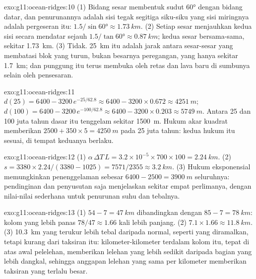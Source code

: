 \begin{solution}{exo:g11:ocean-ridges:10}
(1) Bidang sesar membentuk sudut \ang{60} dengan bidang datar, dan penurunannya
adalah sisi tegak segitiga siku-siku yang sisi miringnya adalah pergeseran itu:
$1.5/\sin\ang{60} \approx \qty{1.73}{km}$. (2) Setiap sesar menjauhkan kedua sisi
secara mendatar sejauh $1.5/\tan\ang{60} \approx \qty{0.87}{km}$; kedua sesar
bersama-sama, sekitar \qty{1.73}{km}. (3) Tidak. \qty{25}{km} itu adalah jarak
antara sesar-sesar yang membatasi blok yang turun, bukan besarnya peregangan,
yang hanya sekitar \qty{1.7}{km}; dan punggung itu terus membuka oleh retas dan
lava baru di sumbunya selain oleh pensesaran.
\end{solution}

\begin{solution}{exo:g11:ocean-ridges:11}
$d(25) = 6400 - 3200\,e^{-25/62.8} \approx 6400 - 3200 \times 0.672 \approx
\qty{4251}{m}$; $d(100) = 6400 - 3200\,e^{-100/62.8} \approx 6400 - 3200
\times 0.203 \approx \qty{5749}{m}$. Antara 25 dan 100 juta tahun dasar itu
tenggelam sekitar \qty{1500}{m}. Hukum akar kuadrat memberikan
$2500 + 350 \times 5 = \qty{4250}{m}$ pada 25 juta tahun: kedua hukum itu
sesuai, di tempat keduanya berlaku.
\end{solution}

\begin{solution}{exo:g11:ocean-ridges:12}
(1) $\alpha\,\Delta T\,L = 3.2 \times 10^{-5} \times 700 \times 100 =
\qty{2.24}{km}$. (2) $s = 3380 \times 2.24/(3380 - 1025) = 7571/2355 \approx
\qty{3.2}{km}$. (3) Hukum eksponensial memungkinkan penenggelaman sebesar
$6400 - 2500 =
\qty{3900}{m}$ seluruhnya: pendinginan dan penyusutan saja menjelaskan sekitar
empat perlimanya, dengan nilai-nilai sederhana untuk penurunan suhu dan tebalnya.
\end{solution}

\begin{solution}{exo:g11:ocean-ridges:13}
(1) $54 - 7 = \qty{47}{km}$ dibandingkan dengan $85 - 7 = \qty{78}{km}$: kolom
yang lebih panas $78/47 \approx 1.66$ kali lebih panjang. (2) $7.1 \times 1.66 \approx
\qty{11.8}{km}$. (3) \qty{10.3}{km} yang terukur lebih tebal daripada normal,
seperti yang diramalkan, tetapi kurang dari taksiran itu: kilometer-kilometer
terdalam kolom itu, tepat di atas awal pelelehan, memberikan lelehan yang lebih
sedikit daripada bagian yang lebih dangkal, sehingga anggapan lelehan yang sama
per kilometer memberikan taksiran yang terlalu besar.
\end{solution}

